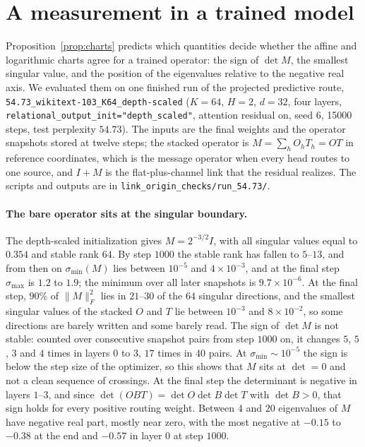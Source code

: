 \documentclass[11pt]{article}
\theoremstyle{definition}
\theoremstyle{remark}
\newcommand{\cfg}[1]{\texttt{#1}}
\begin{document}
\section{A measurement in a trained model}
\label{sec:measurement}

Proposition~\ref{prop:charts} predicts which quantities decide whether the affine and logarithmic charts agree for a trained operator: the sign of $\det M$, the smallest singular value, and the position of the eigenvalues relative to the negative real axis. We evaluated them on one finished run of the projected predictive route, \texttt{54.73\_wikitext-103\_K64\_depth-scaled} ($K=64$, $H=2$, $d=32$, four layers, \cfg{relational\_output\_init="depth\_scaled"}, attention residual on, seed 6, 15000 steps, test perplexity $54.73$). The inputs are the final weights and the operator snapshots stored at twelve steps; the stacked operator is $M=\sum_hO_hT_h=OT$ in reference coordinates, which is the message operator when every head routes to one source, and $I+M$ is the flat-plus-channel link that the residual realizes. The scripts and outputs are in \texttt{link\_origin\_checks/run\_54.73/}.

\paragraph{The bare operator sits at the singular boundary.}
The depth-scaled initialization gives $M=2^{-3/2}I$, with all singular values equal to $0.354$ and stable rank $64$. By step $1000$ the stable rank has fallen to $5$--$13$, and from then on $\sigma_{\min}(M)$ lies between $10^{-5}$ and $4\times10^{-3}$, and at the final step $\sigma_{\max}$ is $1.2$ to $1.9$; the minimum over all later snapshots is $9.7\times10^{-6}$. At the final step, $90\%$ of $\|M\|_F^2$ lies in $21$--$30$ of the $64$ singular directions, and the smallest singular values of the stacked $O$ and $T$ lie between $10^{-3}$ and $8\times10^{-2}$, so some directions are barely written and some barely read. The sign of $\det M$ is not stable: counted over consecutive snapshot pairs from step $1000$ on, it changes $5$, $5$, $3$ and $4$ times in layers $0$ to $3$, $17$ times in $40$ pairs. At $\sigma_{\min}\sim10^{-5}$ the sign is below the step size of the optimizer, so this shows that $M$ sits at $\det=0$ and not a clean sequence of crossings. At the final step the determinant is negative in layers $1$--$3$, and since $\det(OBT)=\det O\det B\det T$ with $\det B>0$, that sign holds for every positive routing weight. Between $4$ and $20$ eigenvalues of $M$ have negative real part, mostly near zero, with the most negative at $-0.15$ to $-0.38$ at the end and $-0.57$ in layer $0$ at step $1000$.
\end{document}
